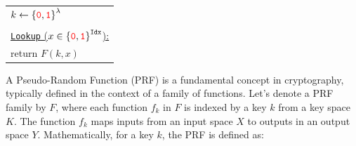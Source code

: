 \documentclass[12pt,openany]{book}
\renewcommand{\arraystretch}{1.25}
\theoremstyle{definition}
\newcommand{\zero}{\textcolor{red}{\texttt{0}}}
\newcommand{\one}{\textcolor{red}{\texttt{1}}}
\newcommand{\tab}{\hspace{12pt}}
\newcommand{\binaryfield}{\set{\zero,\one}}
\newcommand{\indexbit}{\texttt{Idx}}
\newcommand{\outbit}{\texttt{Out}}
\begin{document}
\begin{center}
	\begin{minipage}{.25\textwidth}\centering
		{\renewcommand{\arraystretch}{1.25}\begin{tabular}{|l|}
				\hline
				$k\gets\binaryfield^\lambda$\\
				\\
				\underline{\texttt{Lookup} ($x\in\binaryfield^{\indexbit}$):}\\
				\tab return $F(k,x)$\\
				\hline
		\end{tabular}}
	\end{minipage}
	\begin{minipage}{.7\textwidth}
		\begin{flushright}
		\end{flushright}
	\end{minipage}
\end{center}

A Pseudo-Random Function (PRF) is a fundamental concept in cryptography, typically defined in the context of a family of functions. Let's denote a PRF family by \( F \), where each function \( f_k \) in \( F \) is indexed by a key \( k \) from a key space \( K \). The function \( f_k \) maps inputs from an input space \( X \) to outputs in an output space \( Y \). Mathematically, for a key \( k \), the PRF is defined as:
\end{document}
